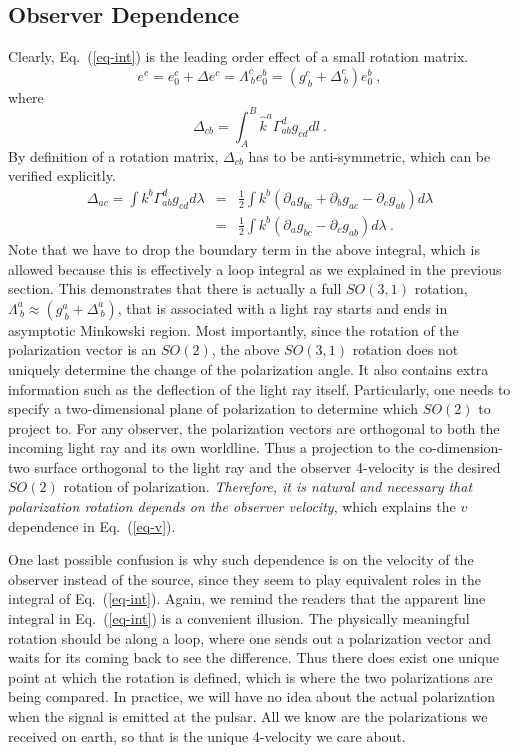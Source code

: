 \documentclass[aps,showpacs,twocolumn,floats,prd,superscriptaddress,nofootinbib]{revtex4}
\begin{document}
\subsection{Observer Dependence}

Clearly, Eq.~(\ref{eq-int}) is the leading order effect of a small rotation matrix.
\begin{equation}
e^c = e_0^c + \Delta e^c = \Lambda^c_{\ b} e_0^b = 
\left( g^c_{\ b} + \Delta^c_{\ b} \right) e_0^b~,
\end{equation}
where
\begin{equation}
\Delta_{cb} = \int_A^B \hat{k}^a \Gamma^d_{ab} g_{cd}dl~.
\end{equation}
By definition of a rotation matrix, $\Delta_{cb}$ has to be anti-symmetric, which can be verified explicitly.
\begin{eqnarray}
\Delta_{ac} = \int k^b\Gamma_{ab}^d g_{cd}d\lambda &=& 
\frac{1}{2} \int k^b \left(\partial_a g_{bc} + \partial_bg_{ac} - \partial_c g_{ab}\right)d\lambda
\label{eq-Delta} \nonumber \\
&=& \frac{1}{2} \int k^b \left(\partial_a g_{bc} - \partial_c g_{ab}\right)d\lambda~.
\end{eqnarray}
Note that we have to drop the boundary term in the above integral, which is allowed because this is effectively a loop integral as we explained in the previous section.
This demonstrates that there is actually a full $SO(3,1)$ rotation, $\Lambda^a_{\ b}\approx\left(g^a_{\ b} + \Delta^a_{\ b}\right)$, that is associated with a light ray starts and ends in asymptotic Minkowski region. 
Most importantly, since the rotation of the polarization vector is an $SO(2)$, the above $SO(3,1)$ rotation does not uniquely determine the change of the polarization angle.
It also contains extra information such as the deflection of the light ray itself. 
Particularly, one needs to specify a two-dimensional plane of polarization to determine which $SO(2)$ to project to. 
For any observer, the polarization vectors are orthogonal to both the incoming light ray and its own worldline. 
Thus a projection to the co-dimension-two surface orthogonal to the light ray and the observer 4-velocity is the desired $SO(2)$ rotation of polarization. 
{\it Therefore, it is natural and necessary that polarization rotation depends on the observer velocity}, which explains the $v$ dependence in Eq.~(\ref{eq-v}).

One last possible confusion is why such dependence is on the velocity of the observer instead of the source, since they seem to play equivalent roles in the integral of Eq.~(\ref{eq-int}). 
Again, we remind the readers that the apparent line integral in Eq.~(\ref{eq-int}) is a convenient illusion.
The physically meaningful rotation should be along a loop, where one sends out a polarization vector and waits for its  coming back to see the difference. 
Thus there does exist one unique point at which the rotation is defined, which is where the two polarizations are being compared. 
In practice, we will have no idea about the actual polarization when the signal is emitted at the pulsar. 
All we know are the polarizations we received on earth, so that is the unique 4-velocity we care about.
\end{document}

